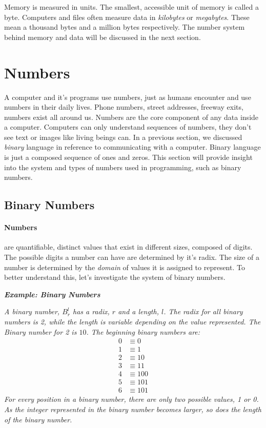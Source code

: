 Memory is measured in units. The smallest, accessible unit of memory is called a byte. Computers and files often measure data in \textit{kilobytes} or \textit{megabytes}. These mean a thousand bytes and a million bytes respectively. The number system behind memory and data will be discussed in the next section.

\section{Numbers}

A computer and it's programs use numbers, just as humans encounter and use numbers in their daily lives. Phone numbers, street addresses, freeway exits, numbers exist all around us. Numbers are the core component of any data inside a computer. Computers can only understand sequences of numbers, they don't see text or images like living beings can. In a previous section, we discussed \textit{binary} language in reference to communicating with a computer. Binary language is just a composed sequence of ones and zeros. This section will provide insight into the system and types of numbers used in programming, such as binary numbers.

\subsection{Binary Numbers}

\paragraph{Numbers} are quantifiable, distinct values that exist in different sizes, composed of digits. The possible digits a number can have are determined by it's radix. The size of a number is determined by the \textit{domain} of values it is assigned to represent. To better understand this, let's investigate the system of binary numbers.

\emph{\textbf{Example: Binary Numbers}}
\begin{center}
\emph{A binary number, $B^l_r$ has a radix, $r$ and a length, $l$. The radix for all binary numbers is 2, while the length is variable depending on the value represented. The Binary number for 2 is $10$. The beginning binary numbers are:}
\begin{align*}
0 &\equiv 0 \\
1 &\equiv 1 \\
2 &\equiv 10 \\
3 &\equiv 11 \\
4 &\equiv 100 \\
5 &\equiv 101 \\
6 &\equiv 101
\end{align*}
\emph{For every position in a binary number, there are only two possible values, 1 or 0. As the integer represented in the binary number becomes larger, so does the length of the binary number.}
\end{center}

